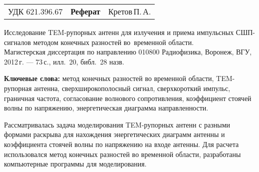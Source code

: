 
\noindent
{
\begin{tabularx}{\textwidth}{lCr}
УДК 621.396.67 & \textbf{Реферат} & Кретов\,П.\,А.
\end{tabularx}}
\vspace{10mm}

\noindent
Исследование TEM-рупорных антенн для излучения и приема импульсных СШП-сигналов
методом конечных разностей во~временной области.\\
Магистерская диссертация по направлению 010800 Радиофизика, Воронеж, ВГУ, 2012\,г.
--- 73\,с., илл.~20, библ.~28 назв.

\vspace{10mm}

\noindent
\textbf{Ключевые слова:}
    метод конечных разностей во временной области,
    TEM-рупорная антенна,
    сверхширокополосный сигнал,
    сверхкороткий импульс,
    граничная частота,
    согласование волнового сопротивления,
    коэффициент стоячей волны по напряжению,
    энергетическая диаграмма направленности.

\vspace{10mm}
\noindent
Рассматривалась задача моделирования TEM-рупорных антенн с разными формами
раскрыва для нахождения энергетических диаграмм антенны и коэффициента стоячей
волны по напряжению на входе антенны. Для расчета использовался метод конечных
разностей во временной области, разработаны компьютерные программы для
моделирования.
\clearpage
